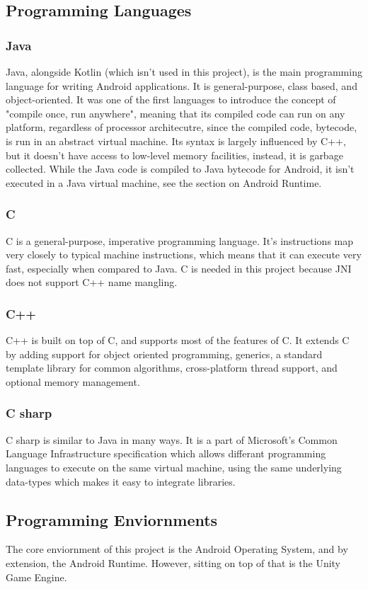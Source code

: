     \subsection{Programming Languages}
        \subsubsection{Java}
        Java, alongside Kotlin (which isn't used in this project), is the main programming language for writing Android applications. It is general-purpose, class based, and object-oriented. It was one of the first languages to introduce the concept of "compile once, run anywhere", meaning that its compiled code can run on any platform, regardless of processor architecutre, since the compiled code, bytecode, is run in an abstract virtual machine. Its syntax is largely influenced by C++, but it doesn't have access to low-level memory facilities, instead, it is garbage collected. While the Java code is compiled to Java bytecode for Android, it isn't executed in a Java virtual machine, see the section on Android Runtime.
        \subsubsection{C}
        C is a general-purpose, imperative programming language. It's instructions map very closely to typical machine instructions, which means that it can execute very fast, especially when compared to Java. C is needed in this project because JNI does not support C++ name mangling.
        \subsubsection{C++}
        C++ is built on top of C, and supports most of the features of C. It extends C by adding support for object oriented programming, generics, a standard template library for common algorithms, cross-platform thread support, and optional memory management.
        \subsubsection{C sharp}
        C sharp is similar to Java in many ways. It is a part of Microsoft's Common Language Infrastructure specification which allows differant programming languages to execute on the same virtual machine, using the same underlying data-types which makes it easy to integrate libraries.

    \subsection{Programming Enviornments}
    The core enviornment of this project is the Android Operating System, and by extension, the Android Runtime. However, sitting on top of that is the Unity Game Engine.
